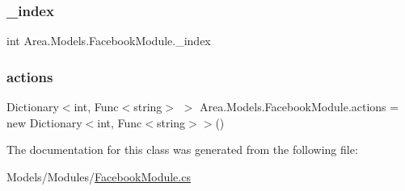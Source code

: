 \subsubsection{\texorpdfstring{\+\_\+index}{\_index}}
{\footnotesize\ttfamily int Area.\+Models.\+Facebook\+Module.\+\_\+index\hspace{0.3cm}{\ttfamily [private]}}

\mbox{\label{classArea_1_1Models_1_1FacebookModule_a6fbe12ae79bf0e6d3a4b24048c4736a6}} 
\subsubsection{\texorpdfstring{actions}{actions}}
{\footnotesize\ttfamily Dictionary$<$int, Func$<$string$>$ $>$ Area.\+Models.\+Facebook\+Module.\+actions = new Dictionary$<$int, Func$<$string$>$$>$()\hspace{0.3cm}{\ttfamily [private]}}



The documentation for this class was generated from the following file\+:\begin{DoxyCompactItemize}
\item 
Models/\+Modules/\mbox{\hyperlink{FacebookModule_8cs}{Facebook\+Module.\+cs}}\end{DoxyCompactItemize}
